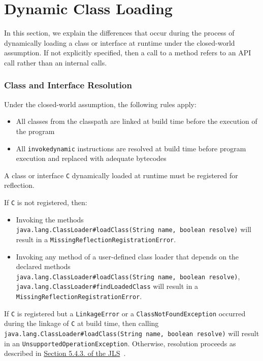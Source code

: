 \section{Dynamic Class Loading}
In this section, we explain the differences that occur during the process of dynamically loading a class or interface at runtime under the closed-world assumption. If not explicitly specified, then a call to a method refers to an API call rather than an internal calls.

\subsubsection{Class and Interface Resolution}

Under the closed-world assumption, the following rules apply: 
\begin{itemize}
    \item All classes from the classpath are linked at build time before the execution of the program  
    \item All \texttt{invokedynamic} instructions are resolved at build time before program execution and replaced with adequate bytecodes
\end{itemize}

A class or interface \verb|C| dynamically loaded at runtime must be registered for reflection.

If \verb|C| is not registered, then: 
\begin{itemize}
    \item Invoking the methods \texttt{java.lang.ClassLoader\#loadClass(String\ name,\ boolean\ resolve)} will result in a \texttt{MissingReflectionRegistrationError}. 
    \item Invoking any method of a user-defined class loader that depends on the declared methods \texttt{java.lang.ClassLoader\#loadClass(String\ name,\ boolean\ resolve)}, \texttt{java.lang.ClassLoader\#findLoadedClass} will result in a \texttt{MissingReflectionRegistrationError}.
\end{itemize}

If \verb|C| is registered but a \texttt{LinkageError} or a \texttt{ClassNotFoundException} occurred during the linkage of \verb|C| at build time, then calling \texttt{java.lang.ClassLoader\#loadClass(String\ name,\ boolean\ resolve)} will result in an \texttt{UnsupportedOperationException}. Otherwise, resolution proceeds as described in \href{https://docs.oracle.com/javase/specs/jvms/se21/html/jvms-5.html\#jvms-5.4.3}{Section
5.4.3. of the JLS}~\cite{noauthor_java_nodate-3}.

